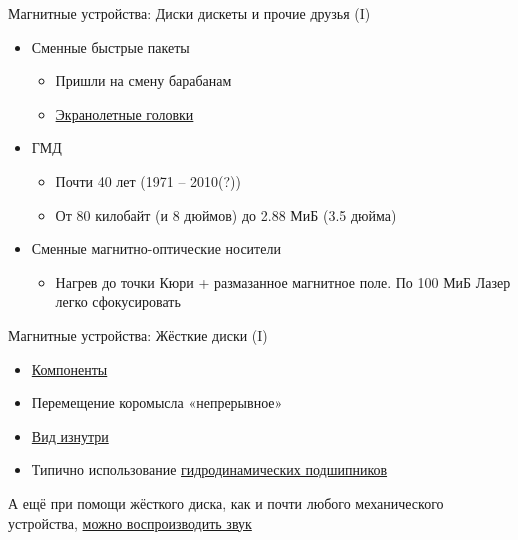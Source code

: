 \documentclass[xetex,aspectratio=43]{beamer}
\begin{document}
\begin{frame}{Магнитные устройства: Диски дискеты и прочие друзья (I)}
\begin{itemize}
\tightlist
\item
  Сменные быстрые пакеты

  \begin{itemize}
  \tightlist
  \item
    Пришли на смену барабанам
  \item
    \href{http://www.ixbt.com/storage/hdd50years.shtml}{Экранолетные
    головки}
  \end{itemize}
\item
  ГМД

  \begin{itemize}
  \tightlist
  \item
    Почти 40 лет (1971 -- 2010(?))
  \item
    От 80 килобайт (и 8 дюймов) до 2.88 МиБ (3.5 дюйма)
  \end{itemize}
\item
  Сменные магнитно-оптические носители

  \begin{itemize}
  \tightlist
  \item
    Нагрев до точки Кюри + размазанное магнитное поле. По 100 МиБ Лазер
    легко сфокусировать
  \end{itemize}
\end{itemize}
\end{frame}

\begin{frame}{Магнитные устройства: Жёсткие диски (I)}

\begin{itemize}
\item
  \href{https://en.wikipedia.org/wiki/Hard_disk_drive\#Components}{Компоненты}
\item Перемещение коромысла «непрерывное»
\item
  \href{https://commons.wikimedia.org/w/index.php?title=File\%3AHardDisk1.ogv}{Вид
  изнутри}
\item
  Типично использование
  \href{https://ru.wikipedia.org/wiki/\%D0\%93\%D0\%B8\%D0\%B4\%D1\%80\%D0\%B0\%D0\%B2\%D0\%BB\%D0\%B8\%D1\%87\%D0\%B5\%D1\%81\%D0\%BA\%D0\%B8\%D0\%B5_\%D0\%B8_\%D0\%BF\%D0\%BD\%D0\%B5\%D0\%B2\%D0\%BC\%D0\%B0\%D1\%82\%D0\%B8\%D1\%87\%D0\%B5\%D1\%81\%D0\%BA\%D0\%B8\%D0\%B5_\%D0\%BF\%D0\%BE\%D0\%B4\%D1\%88\%D0\%B8\%D0\%BF\%D0\%BD\%D0\%B8\%D0\%BA\%D0\%B8}{гидродинамических подшипников}
\end{itemize}

\pause

А ещё при помощи жёсткого диска, как и почти любого механического
устройства, \href{\ytlink{pmfHHLfbjNQ}}{можно воспроизводить звук}
\end{frame}
\end{document}
